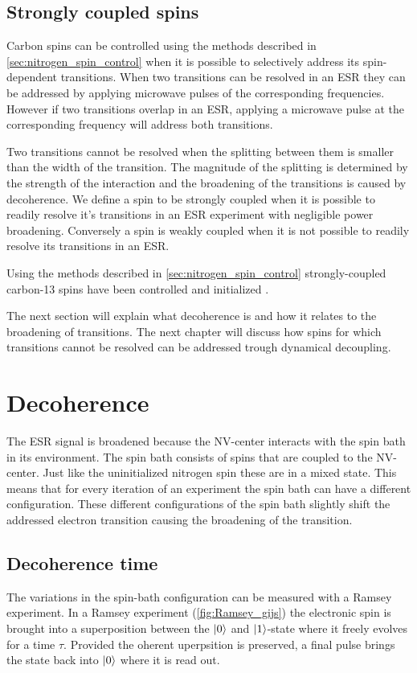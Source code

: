 \subsection{Strongly coupled spins}
Carbon spins can be controlled using the methods described in \cref{sec:nitrogen_spin_control} when it is possible to selectively address its spin-dependent transitions.
When two transitions can be resolved in an ESR they can be addressed by applying microwave pulses of the corresponding frequencies.
However if two transitions overlap in an ESR, applying a microwave pulse at the corresponding frequency will address both transitions.

Two transitions cannot be resolved when the splitting between them is smaller than the width of the transition.
The magnitude of the splitting is determined by the strength of the interaction and the broadening of the transitions is caused by decoherence.
We define a spin to be strongly coupled when it is possible to readily resolve it's transitions in an ESR experiment with negligible power broadening.
Conversely a spin is weakly coupled when it is not possible to readily resolve its transitions in an ESR.

Using the methods described in \cref{sec:nitrogen_spin_control} strongly-coupled carbon-13 spins have been controlled and initialized \citep{Robledo2011HighFidelity}.

The next section will explain what decoherence is and how it relates to the broadening of transitions.
The next chapter will discuss how spins for which transitions cannot be resolved can be addressed trough dynamical decoupling.

\section{Decoherence}
The ESR signal is broadened because the NV-center interacts with the spin bath in its environment.
The spin bath consists of spins that are coupled to the NV-center.
Just like the uninitialized nitrogen spin these are in a mixed state.
This means that for every iteration of an experiment the spin bath can have a different configuration.
These different configurations of the spin bath slightly shift the addressed electron transition causing the broadening of the transition.

\subsection{Decoherence time}
The variations in the spin-bath configuration can be measured with a Ramsey experiment.
In a Ramsey experiment (\cref{fig:Ramsey_gijs}) the electronic spin is brought into a superposition between the ${\left\vert{0}\right\rangle}$ and ${\left\vert{1}\right\rangle}$-state where it freely evolves for a time $\tau$.
Provided the oherent uperpsition is preserved, a final pulse brings the state back into ${\left\vert{0}\right\rangle}$ where it is read out.

